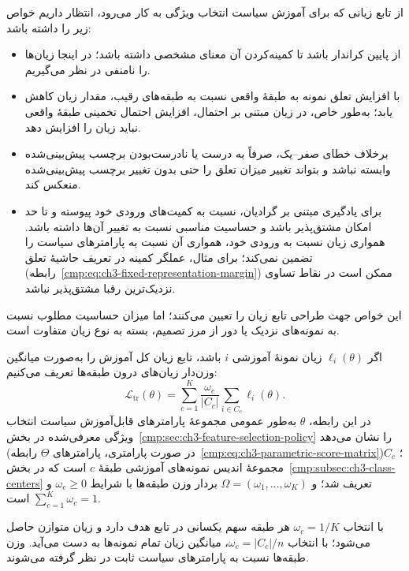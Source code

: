 از تابع زیانی که برای آموزش سیاست انتخاب ویژگی
به کار می‌رود، انتظار داریم خواص زیر را داشته باشد:
\begin{itemize}
\item از پایین کراندار باشد تا کمینه‌کردن آن
معنای مشخصی داشته باشد؛ در اینجا زیان‌ها را
نامنفی در نظر می‌گیریم.
\item با افزایش تعلق نمونه به طبقهٔ واقعی
نسبت به طبقه‌های رقیب، مقدار زیان کاهش یابد؛
به‌طور خاص، در زیان مبتنی بر احتمال، افزایش
احتمال تخمینی طبقهٔ واقعی نباید زیان را افزایش دهد.
\item برخلاف خطای صفر--یک، صرفاً به درست یا
نادرست‌بودن برچسب پیش‌بینی‌شده وابسته نباشد
و بتواند تغییر میزان تعلق را حتی بدون تغییر
برچسب پیش‌بینی‌شده منعکس کند.
\item برای یادگیری مبتنی بر گرادیان، نسبت به
کمیت‌های ورودی خود پیوسته و تا حد امکان
مشتق‌پذیر باشد و حساسیت مناسبی نسبت به تغییر
آن‌ها داشته باشد. همواری زیان نسبت به ورودی خود،
همواری آن نسبت به پارامترهای سیاست را تضمین
نمی‌کند؛ برای مثال، عملگر کمینه در تعریف حاشیهٔ
تعلق (رابطه~\eqref{cmp:eq:ch3-fixed-representation-margin})
ممکن است در نقاط تساوی نزدیک‌ترین رقبا
مشتق‌پذیر نباشد.
\end{itemize}
این خواص جهت طراحی تابع زیان را تعیین می‌کنند؛
اما میزان حساسیت مطلوب نسبت به نمونه‌های نزدیک
یا دور از مرز تصمیم، بسته به نوع زیان متفاوت است.

اگر $\ell_i(\theta)$ زیان نمونهٔ آموزشی $i$ باشد،
تابع زیان کل آموزش را به‌صورت میانگین وزن‌دار
زیان‌های درون طبقه‌ها تعریف می‌کنیم:
\begin{equation}\label{cmp:eq:ch3-training-weighted-loss}
\boxed{
\mathcal L_{\mathrm{tr}}(\theta)
=\sum_{c=1}^{K}\frac{\omega_c}{|C_c|}
\sum_{i\in C_c}\ell_i(\theta).
}
\end{equation}
در این رابطه، $\theta$ به‌طور عمومی مجموعهٔ
پارامترهای قابل‌آموزش سیاست انتخاب ویژگی
معرفی‌شده در
بخش~\ref{cmp:sec:ch3-feature-selection-policy}
را نشان می‌دهد (در صورت پارامتری، پارامترهای
$\Theta$ رابطه~\eqref{cmp:eq:ch3-parametric-score-matrix})؛
$C_c$ مجموعهٔ اندیس نمونه‌های
آموزشی طبقهٔ $c$ است که در
بخش~\ref{cmp:subsec:ch3-class-centers} تعریف شد؛
و $\Omega=(\omega_1,\ldots,\omega_K)$ بردار وزن
طبقه‌ها با شرایط $\omega_c\ge0$ و
$\sum_{c=1}^{K}\omega_c=1$ است.

با انتخاب $\omega_c=1/K$ هر طبقه سهم یکسانی در
تابع هدف دارد و زیان متوازن حاصل می‌شود؛ با انتخاب
$\omega_c=|C_c|/n$، میانگین زیان تمام نمونه‌ها
به دست می‌آید. وزن طبقه‌ها نسبت به پارامترهای
سیاست ثابت در نظر گرفته می‌شوند.

